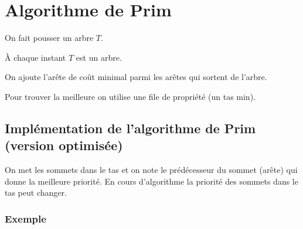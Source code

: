 \chapter{Algorithme de Prim}

On fait pousser un arbre $T$.

À chaque instant $T$ est un arbre.

On ajoute l'arête de coût minimal parmi les arêtes qui sortent de l'arbre.

Pour trouver la meilleure on utilise une file de propriété (un tas min).

\section{Implémentation de l'algorithme de Prim (version optimisée)}

On met les sommets dans le tas et on note le prédécesseur du sommet (arête) qui donne la meilleure priorité. En cours d'algorithme la priorité des sommets dans le tas peut changer.



\subsection*{Exemple}

\newcommand\cunderline[1]{\colorlet{temp}{.}\color{cblue}\underline{\color{temp}#1}\color{temp}}

